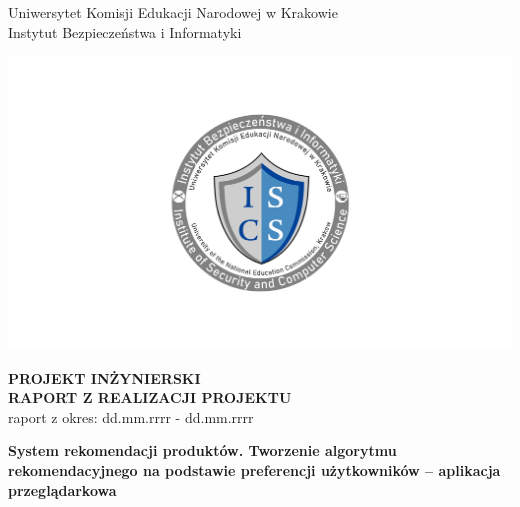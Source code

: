 \documentclass[12pt,a4paper,oneside]{article}
\theoremstyle{definition}
\numberwithin{equation}{section}
\begin{document}

\thispagestyle{empty}
\begin{titlepage}
\begin{center}\Large
Uniwersytet Komisji Edukacji Narodowej w Krakowie\\
\large
Instytut Bezpieczeństwa i Informatyki\\
\vskip 10pt
\end{center}
\begin{center}
\centering \includegraphics[width=1.0\columnwidth]{images/logo.png}
\end{center}

\begin{center}
 {\bf \fontsize{14pt}{14pt}\selectfont PROJEKT INŻYNIERSKI \\ RAPORT Z REALIZACJI PROJEKTU\\
 }
 {\fontsize{12pt}{12pt} raport z okres: dd.mm.rrrr - dd.mm.rrrr}
\end{center}
\vskip 5pt
\begin{center}
 {\bf \fontsize{22pt}{22pt}\selectfont System rekomendacji produktów. Tworzenie algorytmu rekomendacyjnego na
 podstawie preferencji użytkowników – aplikacja przeglądarkowa}
\end{center}


\end{titlepage}
\end{document}
